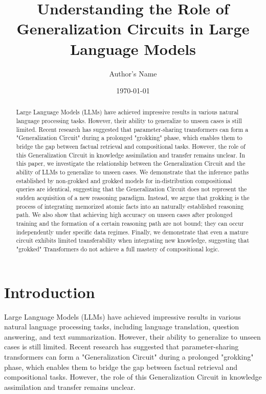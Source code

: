 \documentclass{article}
\begin{document}
\title{Understanding the Role of Generalization Circuits in Large Language Models}

\author{Author's Name}

\date{\today}

\maketitle

\begin{abstract}
Large Language Models (LLMs) have achieved impressive results in various natural language processing tasks. However, their ability to generalize to unseen cases is still limited. Recent research has suggested that parameter-sharing transformers can form a "Generalization Circuit" during a prolonged "grokking" phase, which enables them to bridge the gap between factual retrieval and compositional tasks. However, the role of this Generalization Circuit in knowledge assimilation and transfer remains unclear. In this paper, we investigate the relationship between the Generalization Circuit and the ability of LLMs to generalize to unseen cases. We demonstrate that the inference paths established by non-grokked and grokked models for in-distribution compositional queries are identical, suggesting that the Generalization Circuit does not represent the sudden acquisition of a new reasoning paradigm. Instead, we argue that grokking is the process of integrating memorized atomic facts into an naturally established reasoning path. We also show that achieving high accuracy on unseen cases after prolonged training and the formation of a certain reasoning path are not bound; they can occur independently under specific data regimes. Finally, we demonstrate that even a mature circuit exhibits limited transferability when integrating new knowledge, suggesting that "grokked" Transformers do not achieve a full mastery of compositional logic.

\end{abstract}

\section{Introduction}
Large Language Models (LLMs) have achieved impressive results in various natural language processing tasks, including language translation, question answering, and text summarization. However, their ability to generalize to unseen cases is still limited. Recent research has suggested that parameter-sharing transformers can form a "Generalization Circuit" during a prolonged "grokking" phase, which enables them to bridge the gap between factual retrieval and compositional tasks. However, the role of this Generalization Circuit in knowledge assimilation and transfer remains unclear.
\end{document}
